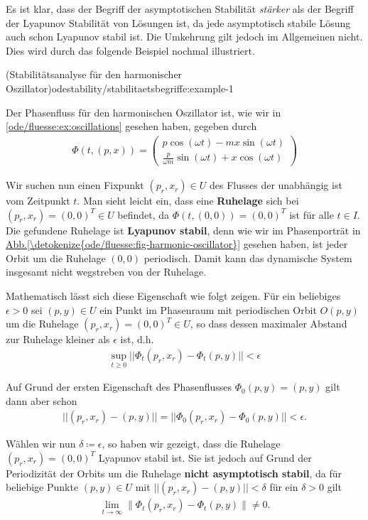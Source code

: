 \documentclass[letterpaper,10pt,german]{jupyterBook}
\begin{document}
\par
Es ist klar, dass der Begriff der asymptotischen Stabilität \emph{stärker} als der Begriff der Lyapunov Stabilität von Lösungen ist, da jede asymptotisch stabile Lösung auch schon Lyapunov stabil ist.
Die Umkehrung gilt jedoch im Allgemeinen nicht.
Dies wird durch das folgende Beispiel nochmal illustriert.
\begin{example}{(Stabilitätsanalyse für den harmonischer Oszillator)}{odestability/stabilitaetsbegriffe:example-1}



\par
Der Phasenfluss für den harmonischen Oszillator ist, wie wir in \cref{ode/fluesse:ex:oscillations} gesehen haben, gegeben durch
\begin{align*}
\Phi(t, (p,x)) = \begin{pmatrix}
p \cos(\omega t) - m x \sin(\omega t)\\
\frac{p}{\omega m}\sin(\omega t) + x\cos(\omega t)
\end{pmatrix}
\end{align*}
\par
Wir suchen nun einen Fixpunkt \((p_r,x_r) \in U\) des Flusses der unabhängig ist vom Zeitpunkt \(t\).
Man sieht leicht ein, dass eine \textbf{Ruhelage} sich bei \((p_r,x_r) = (0,0)^T \in U\) befindet, da \(\Phi(t,(0,0)) = (0,0)^T\) ist für alle \(t \in I\).
Die gefundene Ruhelage ist \textbf{Lyapunov stabil}, denn wie wir im Phasenporträt in \hyperref[\detokenize{ode/fluesse:fig-harmonic-oscillator}]{Abb.\@ \ref{\detokenize{ode/fluesse:fig-harmonic-oscillator}}} gesehen haben, ist jeder Orbit um die Ruhelage \((0,0)\) periodisch. Damit kann das dynamische System insgesamt nicht wegstreben von der Ruhelage.

\par
Mathematisch lässt sich diese Eigenschaft wie folgt zeigen.
Für ein beliebiges \(\epsilon > 0\) sei \((p,y) \in U\) ein Punkt im Phasenraum mit periodischen Orbit \(O(p,y)\) um die Ruhelage \((p_r,x_r) = (0,0)^T \in U\), so dass dessen maximaler Abstand zur Ruhelage kleiner als \(\epsilon\) ist, d.h.
\begin{align*}
\sup_{t \geq 0} ||\Phi_t(p_r,x_r) - \Phi_t(p,y)|| < \epsilon
\end{align*}
\par
Auf Grund der ersten Eigenschaft des Phasenflusses \(\Phi_0(p,y) = (p,y)\) gilt dann aber schon
\begin{align*}
||(p_r, x_r) - (p,y)|| = ||\Phi_0(p_r, x_r) - \Phi_0(p,y)|| < \epsilon.
\end{align*}
\par
Wählen wir nun \(\delta \coloneqq \epsilon\), so haben wir gezeigt, dass die Ruhelage \((p_r, x_r) = (0,0)^T\) Lyapunov stabil ist.
Sie ist jedoch auf Grund der Periodizität der Orbits um die Ruhelage \textbf{nicht asymptotisch stabil}, da für beliebige Punkte \((p,y) \in U\) mit \(||(p_r,x_r) - (p,y)|| < \delta\) für ein \(\delta > 0\) gilt
\begin{align*}
\lim_{t\to\infty}\|\Phi_t(p_r, x_r)-\Phi_t(p,y)\| \neq 0.
\end{align*}\end{example}
\end{document}
